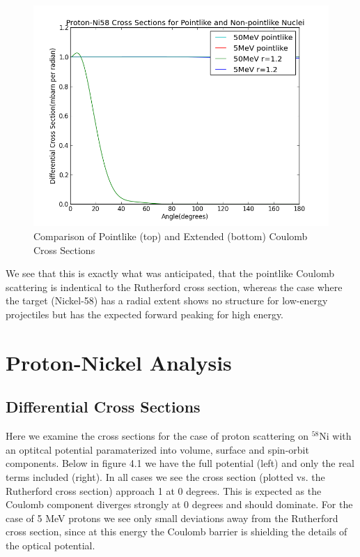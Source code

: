 \documentclass[paper=a4, fontsize=11pt]{scrartcl} %
\numberwithin{equation}{section} %
\numberwithin{figure}{section} %
\numberwithin{table}{section} %
\begin{document}
 \begin{figure}[hbt]
        \centering
        \includegraphics[width=.6\textwidth]{Pointcompare}
        \caption{Comparison of Pointlike (top) and Extended (bottom) Coulomb Cross Sections }
\end{figure}

We see that this is exactly what was anticipated, that the pointlike Coulomb scattering is indentical to the Rutherford cross section, whereas the case where the target (Nickel-58) has a radial extent shows no structure for low-energy projectiles but has the expected forward peaking for high energy. \\

\section{Proton-Nickel Analysis}
\subsection{Differential Cross Sections}

Here we examine the cross sections for the case of proton scattering on $^{58}$Ni with an optitcal potential paramaterized into volume, surface and spin-orbit components.  Below in figure 4.1 we have the full potential (left) and only the real terms included (right).  In all cases we see the cross section (plotted vs. the Rutherford cross section) approach 1 at 0 degrees.  This is expected as the Coulomb component diverges strongly at 0 degrees and should dominate.  For the case of 5 MeV protons we see only small deviations away from the Rutherford cross section, since at this energy the Coulomb barrier is shielding the details of the optical potential.   
\end{document}

